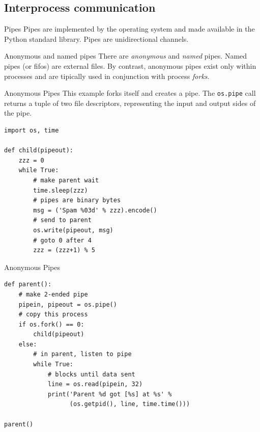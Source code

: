 \documentclass[xcolor=dvipsnames, 10pt, presentation,aspectratio=169]{beamer}
\begin{document}
\subsection{Interprocess communication}
\label{sec:orgf364fb8}
\begin{frame}[label={sec:org03307ce}]{Pipes}
Pipes are implemented by the operating system and made available in
the Python standard library.  Pipes are unidirectional channels.

\begin{block}{Anonymous and named pipes}
There are \emph{anonymous} and \emph{named} pipes. Named pipes (or fifos) are
external files. By contrast, anonymous pipes exist only within
processes and are tipically used in conjunction with process \emph{forks}.
\end{block}
\end{frame}
\begin{frame}[label={sec:orgc67cb90},fragile]{Anonymous Pipes}
 This example forks itself and creates a pipe. The \texttt{os.pipe} call returns
a tuple of two file descriptors, representing the input and output
sides of the pipe.
\lstset{language=Python,label= ,caption= ,captionpos=b,numbers=none}
\begin{lstlisting}
import os, time

def child(pipeout):
    zzz = 0
    while True:
        # make parent wait
        time.sleep(zzz)
        # pipes are binary bytes
        msg = ('Spam %03d' % zzz).encode()
        # send to parent
        os.write(pipeout, msg)
        # goto 0 after 4
        zzz = (zzz+1) % 5
\end{lstlisting}
\end{frame}
\begin{frame}[label={sec:orgd227b8b},fragile]{Anonymous Pipes}
 \lstset{language=Python,label= ,caption= ,captionpos=b,numbers=none}
\begin{lstlisting}
def parent():
    # make 2-ended pipe
    pipein, pipeout = os.pipe()
    # copy this process
    if os.fork() == 0:
        child(pipeout)
    else:
        # in parent, listen to pipe
        while True:
            # blocks until data sent
            line = os.read(pipein, 32)
            print('Parent %d got [%s] at %s' %
                  (os.getpid(), line, time.time()))

parent()
\end{lstlisting}
\end{frame}
\end{document}
